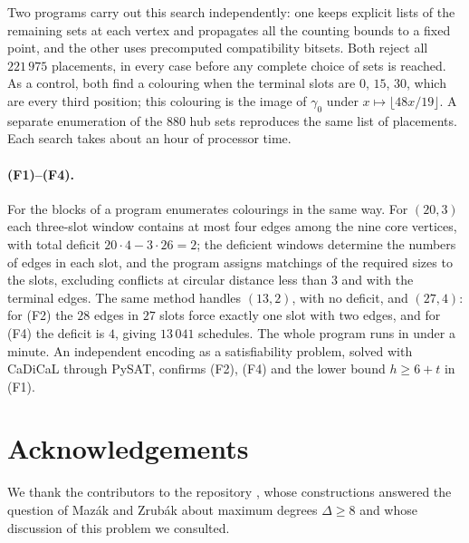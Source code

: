 \documentclass[11pt,colorlinks]{charlie}
\begin{document}
Two programs carry out this search independently: one keeps explicit lists of the remaining sets at each vertex and propagates all the counting bounds to a fixed point, and the other uses precomputed compatibility bitsets. Both reject all $221\,975$ placements, in every case before any complete choice of sets is reached. As a control, both find a colouring when the terminal slots are $0$, $15$, $30$, which are every third position; this colouring is the image of $\gamma_0$ under $x\mapsto\lfloor48x/19\rfloor$. A separate enumeration of the $880$ hub sets reproduces the same list of placements. Each search takes about an hour of processor time.

\paragraph{(F1)--(F4).}
For the blocks of  a program enumerates colourings in the same way. For $(20,3)$ each three-slot window contains at most four edges among the nine core vertices, with total deficit $20\cdot4-3\cdot26=2$; the deficient windows determine the numbers of edges in each slot, and the program assigns matchings of the required sizes to the slots, excluding conflicts at circular distance less than $3$ and with the terminal edges. The same method handles $(13,2)$, with no deficit, and $(27,4)$: for (F2) the $28$ edges in $27$ slots force exactly one slot with two edges, and for (F4) the deficit is $4$, giving $13\,041$ schedules. The whole program runs in under a minute. An independent encoding as a satisfiability problem, solved with CaDiCaL through PySAT, confirms (F2), (F4) and the lower bound $h\ge6+t$ in (F1).

\section*{Acknowledgements}
We thank the contributors to the repository \cite{SC}, whose constructions answered the question of Mazák and Zrubák about maximum degrees $\Delta\ge8$ and whose discussion of this problem we consulted.
\end{document}
